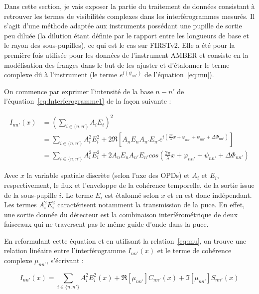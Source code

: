 Dans cette section, je vais exposer la partie du traitement de données consistant à retrouver les termes de visibilités complexes dans les interférogrammes mesurés. Il s'agit d'une méthode adaptée aux instruments possédant une pupille de sortie peu diluée (la dilution étant définie par le rapport entre les longueurs de base et le rayon des sous-pupilles), ce qui est le cas sur FIRSTv2. Elle a été pour la première fois utilisée pour les données de l'instrument \ac{AMBER} \citep{millour2004, tatulli2007} et consiste en la modélisation des franges dans le but de les ajuster et d'étalonner le terme complexe dû à l'instrument (le terme $e^{i(\psi_{nn'})}$ de l'équation~\ref{eq:mu}).

On commence par exprimer l'intensité de la base $n-n'$ de l'équation~\ref{eq:Interferogramme1} de la façon suivante :

\begin{align}
    I_{nn'}(x) &= \left( \sum_{i \in \{n,n'\}} A_i E_i \right)^2 \\
    &= \sum_{i \in \{n,n'\}} A_{i}^{2} E_{i}^{2} + 2 \Re \left[ A_n E_n A_{n'} E_{n'} e^{i(\frac{2 \pi}{\lambda}x + \varphi_{nn'} + \psi_{nn'} + \Delta\Phi_{nn'})}  \right] \\
    &= \sum_{i \in \{n,n'\}} A_{i}^{2} E_{i}^{2} + 2 A_n E_n A_{n'} E_{n'} cos \left(\frac{2 \pi}{\lambda}x + \varphi_{nn'} + \psi_{nn'} + \Delta\Phi_{nn'} \right)
\end{align}

Avec $x$ la variable spatiale discrète (selon l'axe des OPDs) et $A_i$ et $E_{i}$, respectivement, le flux et l'enveloppe de la cohérence temporelle, de la sortie issue de la sous-pupille $i$. Le terme $E_{i}$ est étalonné selon $x$ et en est donc indépendant. Les termes $A_i^2 E_i^2$ caractérisent notamment la transmission de la puce. En effet, une sortie donnée du détecteur est la combinaison interférométrique de deux faisceaux qui ne traversent pas le même guide d'onde dans la puce.

En reformulant cette équation et en utilisant la relation~\ref{eq:mu}, on trouve une relation linéaire entre l'interférogramme $I_{nn'}(x)$ et le terme de cohérence complexe $\mu_{nn'}$, s'écrivant :

\begin{equation}
    I_{nn'}(x) = \sum_{i \in \{n,n'\}} A_{i}^{2} E_{i}^{2}(x) + \Re [\mu_{nn'}] C_{nn'}(x) + \Im [\mu_{nn'}] S_{nn'}(x) \label{eq:InterferogrammeLineaire}
\end{equation}

